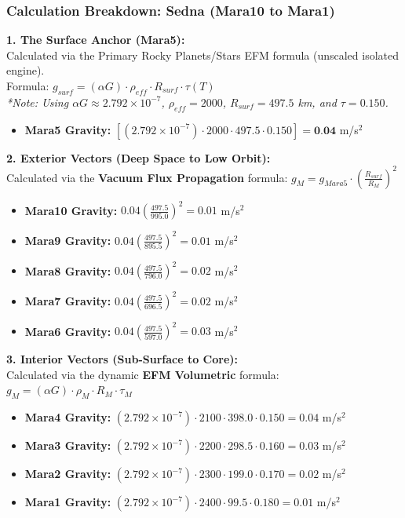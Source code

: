 \documentclass[11pt, a4paper]{article}
\begin{document}
\clearpage
\subsubsection{Calculation Breakdown: Sedna (Mara10 to Mara1)}

\noindent \textbf{1. The Surface Anchor (Mara5):} \\
Calculated via the Primary Rocky Planets/Stars EFM formula (unscaled isolated engine). \\
Formula: $g_{surf} = (\alpha G) \cdot \rho_{eff} \cdot R_{surf} \cdot \tau(T)$ \\
\textit{*Note: Using $\alpha G \approx 2.792 \times 10^{-7}$, $\rho_{eff} = 2000$, $R_{surf} = 497.5$ km, and $\tau = 0.150$.}
\begin{itemize}
  \item \textbf{Mara5 Gravity:} $\left[ (2.792 \times 10^{-7}) \cdot 2000 \cdot 497.5 \cdot 0.150 \right] = \textbf{0.04}$ m/s$^2$
\end{itemize}

\vspace{0.5em}
\noindent \textbf{2. Exterior Vectors (Deep Space to Low Orbit):} \\
Calculated via the \textbf{Vacuum Flux Propagation} formula: $g_M = g_{Mara5} \cdot \left( \frac{R_{surf}}{R_M} \right)^2$
\begin{itemize}
  \item \textbf{Mara10 Gravity:} $0.04 \left( \frac{497.5}{995.0} \right)^2 = 0.01$ m/s$^2$
  \item \textbf{Mara9 Gravity:} $0.04 \left( \frac{497.5}{895.5} \right)^2 = 0.01$ m/s$^2$
  \item \textbf{Mara8 Gravity:} $0.04 \left( \frac{497.5}{796.0} \right)^2 = 0.02$ m/s$^2$
  \item \textbf{Mara7 Gravity:} $0.04 \left( \frac{497.5}{696.5} \right)^2 = 0.02$ m/s$^2$
  \item \textbf{Mara6 Gravity:} $0.04 \left( \frac{497.5}{597.0} \right)^2 = 0.03$ m/s$^2$
\end{itemize}

\vspace{0.5em}
\noindent \textbf{3. Interior Vectors (Sub-Surface to Core):} \\
Calculated via the dynamic \textbf{EFM Volumetric} formula: $g_M = (\alpha G) \cdot \rho_{M} \cdot R_M \cdot \tau_M$
\begin{itemize}
  \item \textbf{Mara4 Gravity:} $(2.792 \times 10^{-7}) \cdot 2100 \cdot 398.0 \cdot 0.150 = 0.04$ m/s$^2$
  \item \textbf{Mara3 Gravity:} $(2.792 \times 10^{-7}) \cdot 2200 \cdot 298.5 \cdot 0.160 = 0.03$ m/s$^2$
  \item \textbf{Mara2 Gravity:} $(2.792 \times 10^{-7}) \cdot 2300 \cdot 199.0 \cdot 0.170 = 0.02$ m/s$^2$
  \item \textbf{Mara1 Gravity:} $(2.792 \times 10^{-7}) \cdot 2400 \cdot 99.5 \cdot 0.180 = 0.01$ m/s$^2$
\end{itemize}
\end{document}
